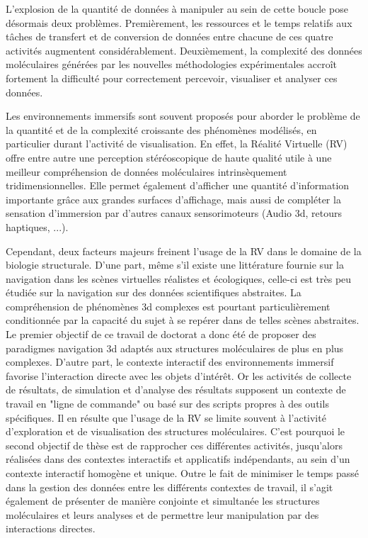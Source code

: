 L'explosion de la quantité de données à manipuler au sein de cette boucle pose désormais deux problèmes. Premièrement, les ressources et le temps relatifs aux tâches de transfert et de conversion de données entre chacune de ces quatre activités augmentent considérablement. Deuxièmement, la complexité des données moléculaires générées par les nouvelles méthodologies expérimentales accroît fortement la difficulté pour correctement percevoir, visualiser et analyser ces données.

Les environnements immersifs sont souvent proposés pour aborder le problème de la quantité et de la complexité croissante des phénomènes modélisés, en particulier durant l'activité de visualisation. En effet, la Réalité Virtuelle (RV) offre entre autre une perception stéréoscopique de haute qualité utile à une meilleur compréhension de données moléculaires intrinsèquement tridimensionnelles. Elle permet également d'afficher une quantité d'information importante grâce aux grandes surfaces d'affichage, mais aussi de compléter la sensation d'immersion par d'autres canaux sensorimoteurs (Audio 3d, retours haptiques, ...). 

Cependant, deux facteurs majeurs freinent l'usage de la RV dans le domaine de la biologie structurale. D'une part, même s'il existe une littérature fournie sur la navigation dans les scènes virtuelles réalistes et écologiques, celle-ci est très peu étudiée sur la navigation sur des données scientifiques abstraites. La compréhension de phénomènes 3d complexes est pourtant particulièrement conditionnée par la capacité du sujet à se repérer dans de telles scènes abstraites. Le premier objectif de ce travail de doctorat a donc été de proposer des paradigmes navigation 3d adaptés aux structures moléculaires de plus en plus complexes. D'autre part, le contexte interactif des environnements immersif favorise l'interaction directe avec les objets d'intérêt. Or les activités de collecte de résultats, de simulation et d'analyse des résultats supposent un contexte de travail en "ligne de commande" ou basé sur des scripts propres à des outils spécifiques. Il en résulte que l'usage de la RV se limite souvent à l'activité d'exploration et de visualisation des structures moléculaires. C'est pourquoi le second objectif de thèse est de rapprocher ces différentes activités, jusqu'alors réalisées dans des contextes interactifs et applicatifs indépendants, au sein d'un contexte interactif homogène et unique. Outre le fait de minimiser le temps passé dans la gestion des données entre les différents contextes de travail, il s'agit également de présenter de manière conjointe et simultanée les structures moléculaires et leurs analyses et de permettre leur manipulation par des interactions directes.


